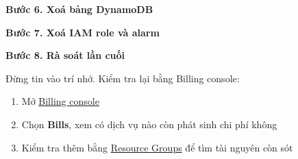 \vspace{0.5em}\noindent\textbf{Bước 6. Xoá bảng
DynamoDB}\par

\begin{Shaded}
\begin{Highlighting}[]
\KeywordTok{;} 
   
\end{Highlighting}
\end{Shaded}

\vspace{0.5em}\noindent\textbf{Bước 7. Xoá IAM role và
alarm}\par

\begin{Shaded}
\begin{Highlighting}[]
\DataTypeTok{\textbackslash{}}

\end{Highlighting}
\end{Shaded}

\vspace{0.5em}\noindent\textbf{Bước 8. Rà soát lần
cuối}\par

Đừng tin vào trí nhớ. Kiểm tra lại bằng Billing console:

\begin{enumerate}
\def\labelenumi{\arabic{enumi}.}
\tightlist
\item
  Mở \href{https://console.aws.amazon.com/billing/home}{Billing console}
\item
  Chọn \textbf{Bills}, xem có dịch vụ nào còn phát sinh chi phí không
\item
  Kiểm tra thêm bằng
  \href{https://console.aws.amazon.com/resource-groups/}{Resource
  Groups} để tìm tài nguyên còn sót
\end{enumerate}

